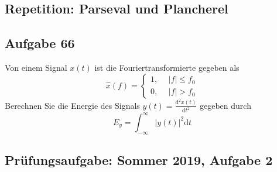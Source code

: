 \documentclass[11pt]{article}
\begin{document}
\pagebreak

\subsection*{Repetition: Parseval und Plancherel}


\subsection*{Aufgabe 66}
\vspace*{-0.5cm}
Von einem Signal $x(t)$ ist die Fouriertransformierte gegeben als 
$$\hat{x}(f) = \begin{cases}
    1, \hspace{15pt} |f| \leq f_0\\
    0, \hspace{15pt} |f| > f_0
\end{cases}$$
Berechnen Sie die Energie des Signals $y(t) = \displaystyle\frac{\text{d}^2x(t)}{\text{d}t^2}$ gegeben durch
$$E_y = \int_{-\infty}^\infty |y(t)|^2 \text{d}t$$


\vfill \null
\pagebreak

\subsection*{Prüfungsaufgabe: Sommer 2019, Aufgabe 2}
\end{document}
